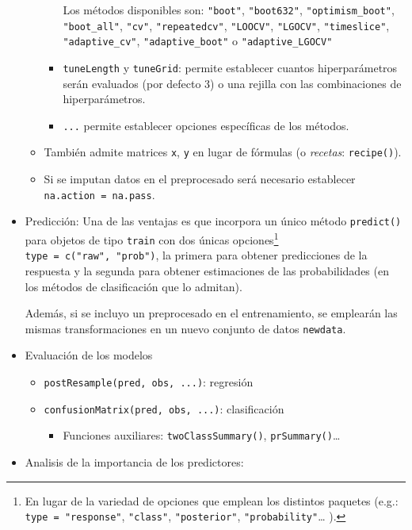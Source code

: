 \documentclass[]{book}
\providecommand{\tightlist}{%
  \setlength{\itemsep}{0pt}\setlength{\parskip}{0pt}}
\theoremstyle{break}
\theoremstyle{definition}
\theoremstyle{definition}
\theoremstyle{definition}
\theoremstyle{remark}
\begin{document}
\begin{itemize}
\begin{itemize}
\begin{itemize}
      Los métodos disponibles son: \texttt{"boot"}, \texttt{"boot632"},
      \texttt{"optimism\_boot"}, \texttt{"boot\_all"}, \texttt{"cv"},
      \texttt{"repeatedcv"}, \texttt{"LOOCV"}, \texttt{"LGOCV"},
      \texttt{"timeslice"}, \texttt{"adaptive\_cv"},
      \texttt{"adaptive\_boot"} o \texttt{"adaptive\_LGOCV"}
    \item
      \texttt{tuneLength} y \texttt{tuneGrid}: permite establecer
      cuantos hiperparámetros serán evaluados (por defecto 3) o una
      rejilla con las combinaciones de hiperparámetros.
    \item
      \texttt{...} permite establecer opciones específicas de los
      métodos.
    \end{itemize}
  \item
    También admite matrices \texttt{x}, \texttt{y} en lugar de fórmulas
    (o \emph{recetas}: \texttt{recipe()}).
  \item
    Si se imputan datos en el preprocesado será necesario establecer
    \texttt{na.action\ =\ na.pass}.
  \end{itemize}
\item
  Predicción: Una de las ventajas es que incorpora un único método
  \texttt{predict()} para objetos de tipo \texttt{train} con dos únicas
  opciones\footnote{En lugar de la variedad de opciones que emplean los
    distintos paquetes (e.g.: \texttt{type\ =\ "response"},
    \texttt{"class"}, \texttt{"posterior"},
    \texttt{"probability"}\ldots{} ).}
  \texttt{type\ =\ c("raw",\ "prob")}, la primera para obtener
  predicciones de la respuesta y la segunda para obtener estimaciones de
  las probabilidades (en los métodos de clasificación que lo admitan).

  Además, si se incluyo un preprocesado en el entrenamiento, se
  emplearán las mismas transformaciones en un nuevo conjunto de datos
  \texttt{newdata}.
\item
  Evaluación de los modelos

  \begin{itemize}
  \item
    \texttt{postResample(pred,\ obs,\ ...)}: regresión
  \item
    \texttt{confusionMatrix(pred,\ obs,\ ...)}: clasificación

    \begin{itemize}
    \tightlist
    \item
      Funciones auxiliares: \texttt{twoClassSummary()},
      \texttt{prSummary()}\ldots{}
    \end{itemize}
  \end{itemize}
\item
  Analisis de la importancia de los predictores:


\end{itemize}
\end{document}
